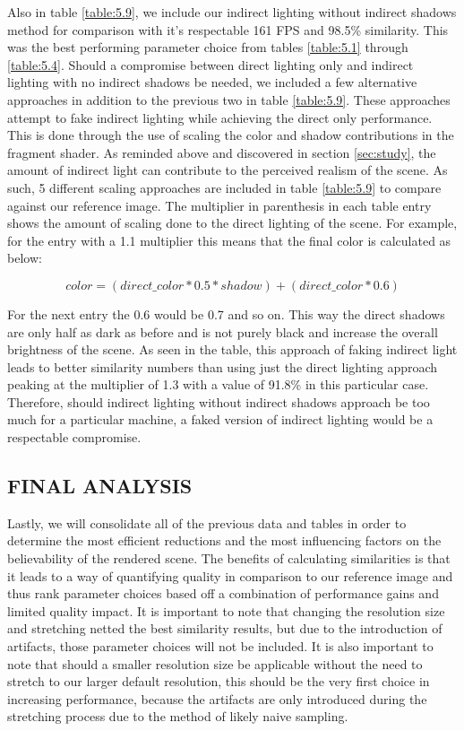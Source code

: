 Also in table \ref{table:5.9}, we include our indirect lighting without indirect shadows method for comparison with it's respectable 161 FPS and 98.5\% similarity.  This was the best performing parameter choice from tables \ref{table:5.1} through \ref{table:5.4}.  Should a compromise between direct lighting only and indirect lighting with no indirect shadows be needed, we included a few alternative approaches in addition to the previous two in table \ref{table:5.9}.  These approaches attempt to fake indirect lighting while achieving the direct only performance.  This is done through the use of scaling the color and shadow contributions in the fragment shader.  As reminded above and discovered in section \ref{sec:study}, the amount of indirect light can contribute to the perceived realism of the scene.  As such, 5 different scaling approaches are included in table \ref{table:5.9} to compare against our reference image.  The multiplier in parenthesis in each table entry shows the amount of scaling done to the direct lighting of the scene.  For example, for the entry with a 1.1 multiplier this means that the final color is calculated as below:

\begin{equation}
color = (direct\_color*0.5*shadow)+(direct\_color*0.6)
\end{equation}

For the next entry the 0.6 would be 0.7 and so on.  This way the direct shadows are only half as dark as before and is not purely black and increase the overall brightness of the scene.  As seen in the table, this approach of faking indirect light leads to better similarity numbers than using just the direct lighting approach peaking at the multiplier of 1.3 with a value of 91.8\% in this particular case.  Therefore, should indirect lighting without indirect shadows approach be too much for a particular machine, a faked version of indirect lighting would be a respectable compromise.

\subsection{FINAL ANALYSIS} \label{sec:finalAnalysis}
Lastly, we will consolidate all of the previous data and tables in order to determine the most efficient reductions and the most influencing factors on the believability of the rendered scene.  The benefits of calculating similarities is that it leads to a way of quantifying quality in comparison to our reference image and thus rank parameter choices based off a combination of performance gains and limited quality impact.  It is important to note that changing the resolution size and stretching netted the best similarity results, but due to the introduction of artifacts, those parameter choices will not be included.  It is also important to note that should a smaller resolution size be applicable without the need to stretch to our larger default resolution, this should be the very first choice in increasing performance, because the artifacts are only introduced during the stretching process due to the method of likely naive sampling.

